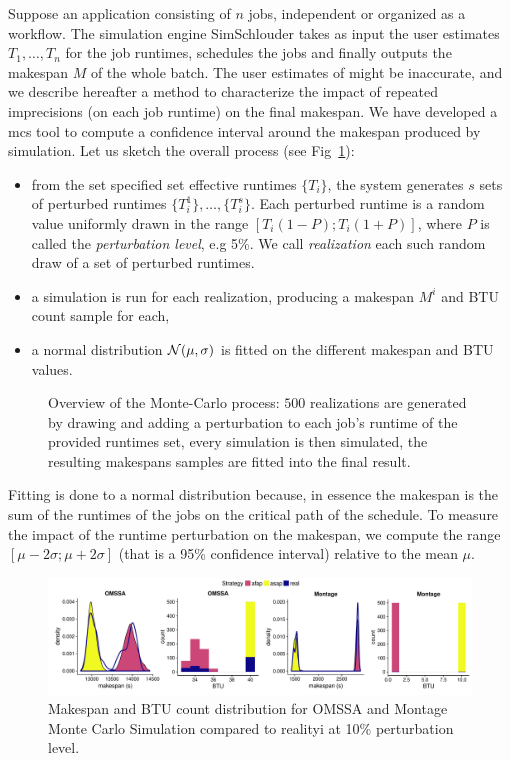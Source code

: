\documentclass[10pt,conference,compsocconf]{IEEEtran}
\begin{document}
Suppose an  application consisting of  $n$ jobs,  independent or organized  as a
workflow.  The simulation engine SimSchlouder  takes as input the user estimates
$T_1, \ldots , T_n$ for the job runtimes, schedules the jobs and finally outputs
the makespan $M$ of the whole batch.  The user estimates of might be inaccurate,
and  we describe  hereafter  a method  to characterize  the  impact of  repeated
imprecisions (on each  job runtime) on the final makespan.   We have developed a
\ac{mcs} tool to  compute a confidence interval around the  makespan produced by
simulation.  Let us sketch the overall process (see Fig~\ref{fig:mc-process}):
\begin{itemize} 
\item from the set specified set effective runtimes $\{T_i\}$, the system
	generates $s$ sets of perturbed runtimes $\{T_i^1\}, \ldots, \{T_i^s\}$.
	Each perturbed runtime is a random value uniformly drawn in the range
	$[T_i (1-P); T_i (1+P)]$, where $P$ is called the \emph{perturbation
	level}, e.g 5\%. We call \emph{realization} each such random draw of a
	set of perturbed runtimes.
\item a simulation  is run for each realization, producing a makespan $M^i$ and
	BTU count sample for each,
\item  a  normal  distribution  ${\cal N}(\mu,\sigma)$  is  fitted  on
	the different makespan and BTU values.
\end{itemize}
\begin{figure}
	\centering
	\resizebox{0.5\textwidth}{!}{%
		
		}
\caption{Overview of the Monte-Carlo process: $500$ realizations are generated
by drawing and adding a perturbation to each job's runtime of the provided
runtimes set, every simulation is then simulated, the resulting makespans
samples are fitted into the final result.}\label{fig:mc-process}
\end{figure}
Fitting is done to a normal distribution because, in essence the makespan is the
sum  of the  runtimes of  the jobs  on the  critical path  of the  schedule.  To
measure the impact  of the runtime perturbation on the  makespan, we compute the
range $[\mu-2\sigma;\mu+2\sigma]$ (that is  a 95\% confidence interval) relative
to  the mean  $\mu$. 

\begin{figure}
	\includegraphics[width=\textwidth]{gfx/fit_plot.pdf}
	\caption{Makespan and BTU count distribution for OMSSA and Montage Monte
	Carlo Simulation compared to realityi at 10\% perturbation
	level.}\label{fig:fit}
\end{figure}
\end{document}
